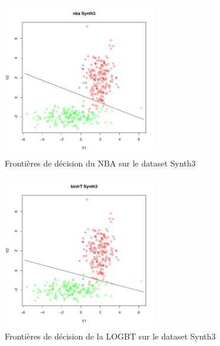 \documentclass{report}
\begin{document}
\begin{figure}[ht!]
\begin{center}
    \includegraphics[width=0.6\textwidth]{results/nba/nba-Synth3.pdf}
    \caption{Frontières de décision du NBA sur le dataset Synth3}
\end{center}
\end{figure}

\begin{figure}[ht!]
\begin{center}
    \includegraphics[width=0.6\textwidth]{results/binlrt/binlrt-Synth3.pdf}
    \caption{Frontières de décision de la LOGBT sur le dataset Synth3}
\end{center}
\end{figure}
\end{document}
